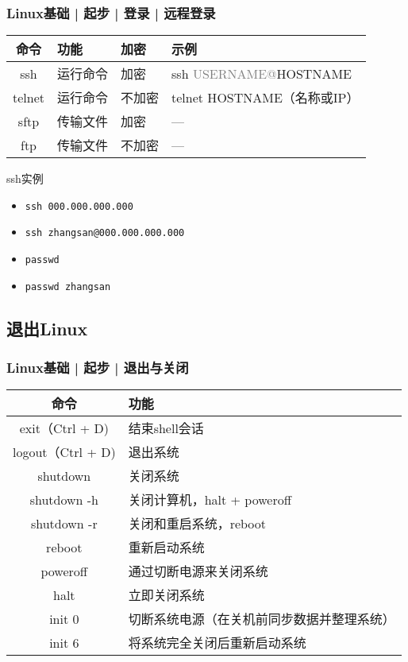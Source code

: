 \begin{frame}[fragile]
  \frametitle{Linux基础 | 起步 | 登录 | 远程登录}
  \begin{table}
    \centering
    \begin{tabular}{clll}
      \hline
      \rowcolor{blue!50}命令 & 功能 & 加密 & 示例\\
      \hline
      \alert{ssh} & 运行命令 & 加密 & ssh \textcolor{gray}{USERNAME@}HOSTNAME\\
      telnet & 运行命令 & 不加密 & telnet HOSTNAME（名称或IP）\\
      sftp & 传输文件 & 加密 & ---\\
      ftp & 传输文件 & 不加密 & ---\\
      \hline
    \end{tabular}
  \end{table}
  \pause
  \begin{block}{ssh实例}
    \begin{itemize}
      \item \verb|ssh 000.000.000.000|
      \item \verb|ssh zhangsan@000.000.000.000|
      \item \verb|passwd|
      \item \verb|passwd zhangsan|
    \end{itemize}
  \end{block}
\end{frame}

\subsection{退出Linux}
\begin{frame}
  \frametitle{Linux基础 | 起步 | 退出与关闭}
  \begin{table}
    \centering
    \begin{tabular}{cl}
      \hline
      \rowcolor{blue!50}命令 & 功能\\
      \hline
      exit（Ctrl + D) & 结束shell会话\\
      logout（Ctrl + D) & 退出系统\\
      \hline
      shutdown & 关闭系统\\
      \alert{shutdown -h} & 关闭计算机，halt + poweroff\\
      shutdown -r & 关闭和重启系统，reboot\\
      \alert{reboot} & 重新启动系统\\
      poweroff & 通过切断电源来关闭系统\\
      halt & 立即关闭系统\\
      init 0 & 切断系统电源（在关机前同步数据并整理系统）\\
      init 6 & 将系统完全关闭后重新启动系统\\
      \hline
    \end{tabular}
  \end{table}
\end{frame}

